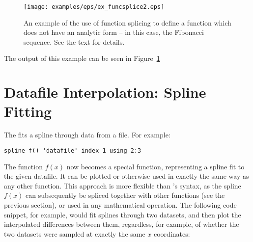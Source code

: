 \begin{figure}
\begin{center}
\texttt{[image: examples/eps/ex\_funcsplice2.eps]}
\end{center}
\caption{An example of the use of function splicing to define a function which does not have an analytic form -- in this case, the Fibonacci sequence. See the text for details.}
\label{fig:ex_funcsplice2}
\end{figure}

\noindent The output of this example can be seen in Figure~\ref{fig:ex_funcsplice2}

\section{Datafile Interpolation: Spline Fitting}
\label{spline_command}

%
%
The  fits a spline through data from a file.  For example:

\begin{verbatim}
spline f() 'datafile' index 1 using 2:3
\end{verbatim}

The function $f(x)$ now becomes a special function, representing a spline fit
to the given datafile. It can be plotted or otherwise used in exactly the same
way as any other function. This approach is more flexible than \gnuplot's
syntax, as the spline $f(x)$ can subsequently be spliced together with other
functions (see the previous section), or used in any mathematical operation.
The following code snippet, for example, would fit splines through two
datasets, and then plot the interpolated differences between them, regardless,
for example, of whether the two datasets were sampled at exactly the same $x$
coordinates:


